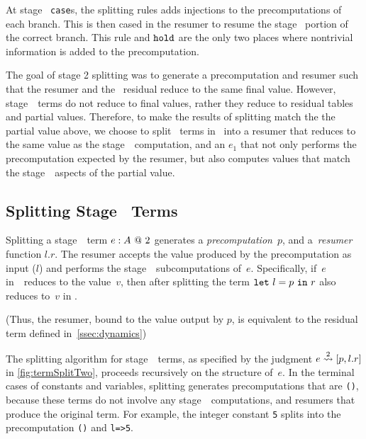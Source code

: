 At stage \bbone\ {\tt case}s, the splitting rules adds injections to the precomputations of each branch. 
This is then cased in the resumer to resume the stage \bbtwo\ portion of the correct branch.
This rule and ${\tt hold}$ are the only two places where nontrivial information is added to the precomputation.

The goal of stage 2 splitting was to generate a precomputation and resumer such
that the resumer and the \lang\ residual reduce to the same final value.
However, stage~\bbone\ terms do not reduce to final values, rather they reduce
to residual tables and partial values.  
Therefore, to make the results of splitting match the
the partial value above, we choose to split \bbone\ terms in \lang\ into a
resumer that reduces to the same value as the stage~\bbtwo\ computation, and an
$e_1$ that not only performs the precomputation expected by the resumer, but
also computes values that match the stage~\bbone\ aspects of the partial value.


\subsection{Splitting Stage \bbtwo\ Terms}

Splitting a stage~\bbtwo\ term ${e}:{A}~@~ 2$ generates a
\emph{precomputation}~$p$, and a~\emph{resumer} function $l.r$.  The
resumer accepts the value produced by the precomputation as input
($l$) and performs the stage~\bbtwo\ subcomputations of~$e$.
Specifically, if~$e$ in~\lang\ reduces to the value~$v$, then after
splitting the term ${\tt let}~{l} = {p}~{\tt in}~{r}$ also reduces to~$v$ in \langmono.

(Thus, the resumer, bound to the value output by $p$, is equivalent to
the residual term defined in~\ref{ssec:dynamics})




The splitting algorithm for stage~\bbtwo\ terms, as specified by the
judgment $e \overset{ 2}\rightsquigarrow [p,l.r]$ in \cref{fig:termSplitTwo}, proceeds
recursively on the structure of~$e$.  In the terminal cases of
constants and variables, splitting generates precomputations that are
\texttt{()}, because these terms do not involve any stage~\bbone\
computations, and resumers that produce the original term. For
example, the integer constant \texttt{5} splits into the
precomputation \texttt{()} and \texttt{l=>5}.

